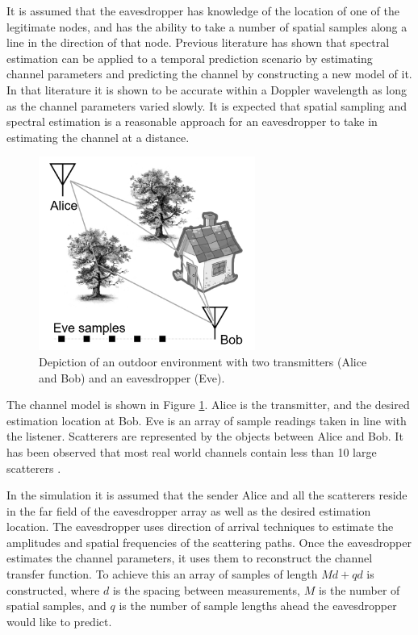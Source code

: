\documentclass{allertonproc}
\begin{document}
It is assumed that the eavesdropper has knowledge of the location of one of the legitimate nodes, and has the ability to take a number of spatial samples along a line in the direction of that node.  Previous literature \cite{duel-hallen2007} has shown that spectral estimation can be applied to a temporal prediction scenario by estimating channel parameters and predicting the channel by constructing a new model of it. In that literature it is shown to be accurate within a Doppler wavelength as long as the channel parameters varied slowly. It is expected that spatial sampling and spectral estimation is a reasonable approach for an eavesdropper to take in estimating the channel at a distance. 


\begin{figure}[ht!]
\begin{center}
\includegraphics[height=2.5in]{Scenario}
\caption{Depiction of an outdoor environment with two transmitters (Alice and Bob) and an eavesdropper (Eve).}\label{scene}
\end{center}
\end{figure}

The channel model is shown in Figure \ref{scene}. Alice is the transmitter, and the desired estimation location at Bob. Eve is an array of sample readings taken in line with the listener. Scatterers are represented by the objects between Alice and Bob. It has been observed that most real world channels contain less than 10 large scatterers \cite{duel-hallen2000}. 

In the simulation it is assumed that the sender Alice and all the scatterers reside in the far field of the eavesdropper array as well as the desired estimation location. The eavesdropper uses direction of arrival techniques to estimate the amplitudes and spatial frequencies of the scattering paths. Once the eavesdropper estimates the channel parameters, it uses them to reconstruct the channel transfer function. To achieve this an array of samples of length $Md+qd$ is constructed, where $d$ is the spacing between measurements, $M$ is the number of spatial samples, and $q$ is the number of sample lengths ahead the eavesdropper would like to predict. 
\end{document}

